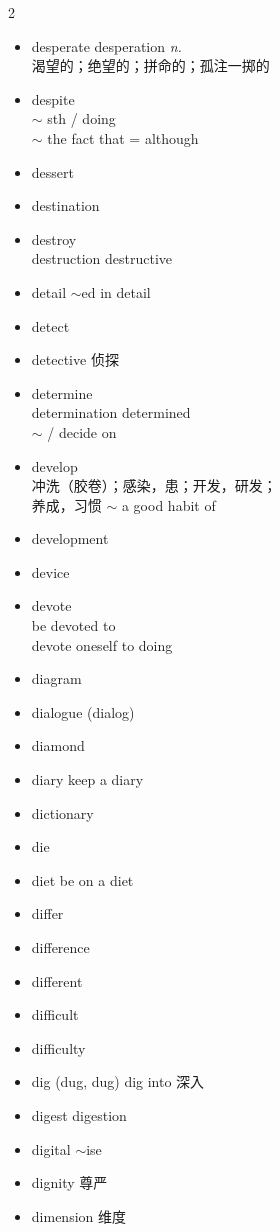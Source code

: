 \documentclass[../../book.tex]{subfiles}
\begin{document}
\begin{multicols}{2}
\begin{itemize}
\item[-] desperate \phantom{a} desperation \emph{n.}
\\渴望的；绝望的；拼命的；孤注一掷的
\item[-] despite
\\$\sim$ sth / doing
\\$\sim$ the fact that = although
\item[-] dessert
\item[-] destination
\item[-] destroy
\\destruction destructive
\item[-] detail \phantom{a} $\sim$ed \phantom{a} in detail
\item[-] detect
\item[-] detective 侦探
\item[-] determine
\\determination determined
\\$\sim$ / decide on
\item[-] develop
\\冲洗（胶卷）；感染，患；开发，研发；\\养成，习惯 $\sim$ a good habit of
\item[-] development
\item[-] device
\item[-] devote
\\be devoted to
\\devote oneself to doing
\item[-] diagram
\item[-] dialogue (dialog)
\item[-] diamond
\item[-] diary \phantom{a} keep a diary
\item[-] dictionary
\item[-] die
\item[-] diet \phantom{a} be on a diet
\item[-] differ
\item[-] difference
\item[-] different
\item[-] difficult
\item[-] difficulty
\item[-] dig (dug, dug) \phantom{a} dig into 深入
\item[-] digest \phantom{a} digestion
\item[-] digital \phantom{a} $\sim$ise
\item[-] dignity 尊严
\item[-] dimension 维度

\end{itemize}
\end{multicols}
\end{document}
